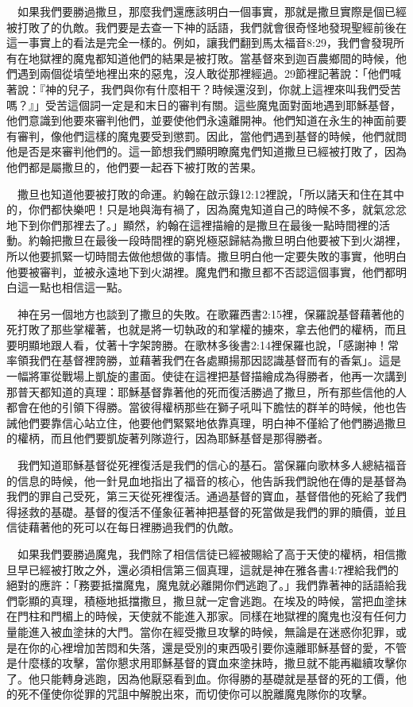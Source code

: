 \documentclass{book}
\begin{document}
　如果我們要勝過撒旦，那麼我們還應該明白一個事實，那就是撒旦實際是個已經被打敗了的仇敵。我們要是去查一下神的話語，我們就會很奇怪地發現聖經前後在這一事實上的看法是完全一樣的。例如，讓我們翻到馬太福音8:29，我們會發現所有在地獄裡的魔鬼都知道他們的結果是被打敗。當基督來到迦百農鄉間的時候，他們遇到兩個從墳塋地裡出來的惡鬼，沒人敢從那裡經過。29節裡記著說：「他們喊著說：『神的兒子，我們與你有什麼相干？時候還沒到，你就上這裡來叫我們受苦嗎？』」受苦這個詞一定是和末日的審判有關。這些魔鬼面對面地遇到耶穌基督，他們意識到他要來審判他們，並要使他們永遠離開神。他們知道在永生的神面前要有審判，像他們這樣的魔鬼要受到懲罰。因此，當他們遇到基督的時候，他們就問他是否是來審判他們的。這一節想我們顯明瞭魔鬼們知道撒旦已經被打敗了，因為他們都是屬撒旦的，他們要一起吞下被打敗的苦果。

　撒旦也知道他要被打敗的命運。約翰在啟示錄12:12裡說，「所以諸天和住在其中的，你們都快樂吧！只是地與海有禍了，因為魔鬼知道自己的時候不多，就氣忿忿地下到你們那裡去了。」顯然，約翰在這裡描繪的是撒旦在最後一點時間裡的活動。約翰把撒旦在最後一段時間裡的窮兇極惡歸結為撒旦明白他要被下到火湖裡，所以他要抓緊一切時間去做他想做的事情。撒旦明白他一定要失敗的事實，他明白他要被審判，並被永遠地下到火湖裡。魔鬼們和撒旦都不否認這個事實，他們都明白這一點也相信這一點。

　神在另一個地方也談到了撒旦的失敗。在歌羅西書2:15裡，保羅說基督藉著他的死打敗了那些掌權著，也就是將一切執政的和掌權的擄來，拿去他們的權柄，而且要明顯地跟人看，仗著十字架誇勝。在歌林多後書2:14裡保羅也說，「感謝神！常率領我們在基督裡誇勝，並藉著我們在各處顯揚那因認識基督而有的香氣」。這是一幅將軍從戰場上凱旋的畫面。使徒在這裡把基督描繪成為得勝者，他再一次講到那普天都知道的真理：耶穌基督靠著他的死而復活勝過了撒旦，所有那些信他的人都會在他的引領下得勝。當彼得權柄那些在獅子吼叫下膽怯的群羊的時候，他也告誡他們要靠信心站立住，他要他們緊緊地依靠真理，明白神不僅給了他們勝過撒旦的權柄，而且他們要凱旋著列隊遊行，因為耶穌基督是那得勝者。

　我們知道耶穌基督從死裡復活是我們的信心的基石。當保羅向歌林多人總結福音的信息的時候，他一針見血地指出了福音的核心，他告訴我們說他在傳的是基督為我們的罪自己受死，第三天從死裡復活。通過基督的寶血，基督借他的死給了我們得拯救的基礎。基督的復活不僅象征著神把基督的死當做是我們的罪的贖價，並且信徒藉著他的死可以在每日裡勝過我們的仇敵。

　如果我們要勝過魔鬼，我們除了相信信徒已經被賜給了高于天使的權柄，相信撒旦早已經被打敗之外，還必須相信第三個真理，這就是神在雅各書4:7裡給我們的絕對的應許：「務要抵擋魔鬼，魔鬼就必離開你們逃跑了。」我們靠著神的話語給我們彰顯的真理，積極地抵擋撒旦，撒旦就一定會逃跑。在埃及的時候，當把血塗抹在門柱和門楣上的時候，天使就不能進入那家。同樣在地獄裡的魔鬼也沒有任何力量能進入被血塗抹的大門。當你在經受撒旦攻擊的時候，無論是在迷惑你犯罪，或是在你的心裡增加苦悶和失落，還是受別的東西吸引要你遠離耶穌基督的愛，不管是什麼樣的攻擊，當你懇求用耶穌基督的寶血來塗抹時，撒旦就不能再繼續攻擊你了。他只能轉身逃跑，因為他厭惡看到血。你得勝的基礎就是基督的死的工價，他的死不僅使你從罪的咒詛中解脫出來，而切使你可以脫離魔鬼隊你的攻擊。
\end{document}
